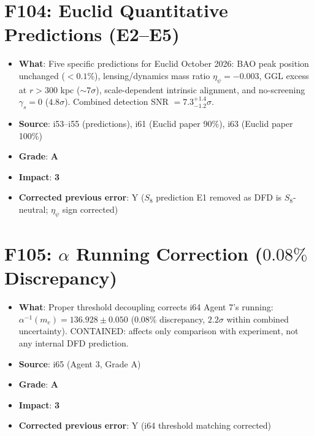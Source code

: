 \documentclass[11pt,a4paper]{article}
\newcommand{\grade}[1]{\textbf{#1}}
\newcommand{\impact}[1]{\textbf{#1}}
\begin{document}
\section{F104: Euclid Quantitative Predictions (E2--E5)}
\begin{itemize}[nosep]
\item \textbf{What}: Five specific predictions for Euclid October 2026: BAO peak position unchanged ($< 0.1\%$), lensing/dynamics mass ratio $\eta_\psi = -0.003$, GGL excess at $r > 300$ kpc ($\sim 7\sigma$), scale-dependent intrinsic alignment, and no-screening $\gamma_s = 0$ ($4.8\sigma$). Combined detection SNR $= 7.3^{+1.4}_{-1.2}\sigma$.
\item \textbf{Source}: i53--i55 (predictions), i61 (Euclid paper 90\%), i63 (Euclid paper 100\%)
\item \textbf{Grade}: \grade{A}
\item \textbf{Impact}: \impact{3}
\item \textbf{Corrected previous error}: Y ($S_8$ prediction E1 removed as DFD is $S_8$-neutral; $\eta_\psi$ sign corrected)
\end{itemize}

\section{F105: $\alpha$ Running Correction ($0.08\%$ Discrepancy)}
\begin{itemize}[nosep]
\item \textbf{What}: Proper threshold decoupling corrects i64 Agent 7's running: $\alpha^{-1}(m_e) = 136.928 \pm 0.050$ (0.08\% discrepancy, $2.2\sigma$ within combined uncertainty). CONTAINED: affects only comparison with experiment, not any internal DFD prediction.
\item \textbf{Source}: i65 (Agent 3, Grade A)
\item \textbf{Grade}: \grade{A}
\item \textbf{Impact}: \impact{3}
\item \textbf{Corrected previous error}: Y (i64 threshold matching corrected)
\end{itemize}

\end{document}
